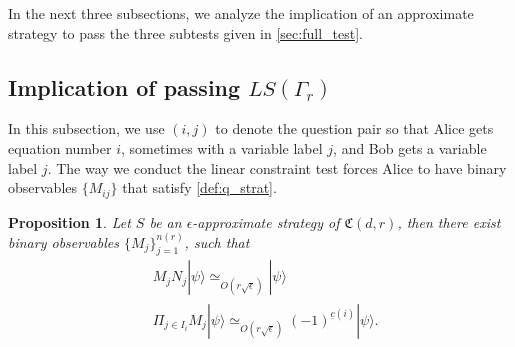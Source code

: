 \documentclass[11pt,letterpaper]{article}
\newcommand{\ket}[1]{|#1\rangle}
\newcommand{\1}{\mathbb{1}}
\newcommand{\LS}{LS}
\newcommand{\nr}{n(r)}
\newcommand{\uc}{\underline{c}}
\newcommand{\fC}{\mathfrak{C}}
\newcommand{\ep}{\epsilon}
\newcommand{\se}{\sqrt{\epsilon}}
\newcommand{\appd}[1]{\simeq_{#1}}
\newtheorem{proposition}[theorem]{Proposition}
\theoremstyle{definition}
\begin{document}
In the next three subsections, we analyze the implication of an approximate strategy to pass the 
three subtests given in \cref{sec:full_test}.

\subsection{Implication of passing $\LS(\Gamma_r)$}
\label{sec:imp_lct}
In this subsection, we use $(i,j)$ to denote the question pair so that Alice gets equation number $i$, sometimes with a variable label $j$,
 and Bob gets a variable label $j$.
The way we conduct the linear constraint test forces Alice to have binary observables $\{M_{ij}\}$ that satisfy 
\cref{def:q_strat}.
\begin{proposition}
	\label{prop:lct_base}
	Let $S$ be an $\ep$-approximate strategy of $\fC(d,r)$,
	then there exist binary observables $\{ M_j \}_{j=1}^{\nr} $, such that
	\begin{align}
		&M_j N_j \ket{\psi} \appd{O(r\se)} \ket{\psi} \\
		&\Pi_{j \in I_i} M_j \ket{\psi} \appd{O(r\se)}(-1)^{\uc(i)} \ket{\psi}.
	\end{align}
\end{proposition}
\end{document}

